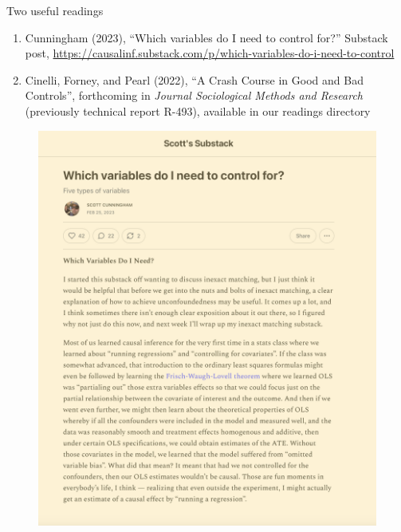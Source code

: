 \documentclass{beamer}
\begin{document}
\begin{frame}{Two useful readings}

\begin{enumerate}
\item Cunningham (2023), ``Which variables do I need to control for?'' Substack post, \url{https://causalinf.substack.com/p/which-variables-do-i-need-to-control}
\item Cinelli, Forney, and Pearl (2022), ``A Crash Course in Good and Bad Controls'', forthcoming in \emph{Journal Sociological Methods and Research} (previously technical report R-493), available in our readings directory
\end{enumerate}

\end{frame}


\begin{frame}{}

  \begin{figure}
    \includegraphics[scale=0.25]{./lecture_includes/scott_controls}
  \end{figure}

\end{frame}
\end{document}
